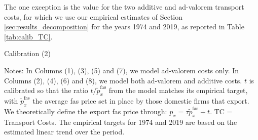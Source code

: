 \documentclass[a4paper,11pt]{article}
\begin{document}
The one exception is the value for the two additive and ad-valorem transport costs, for which we use our empirical estimates of Section \ref{sec:results_decomposition} for the years 1974 and 2019, as reported in Table \ref{tab:calib_TC}.

\begin{table}[htb]
  \centering
  \caption{Calibration (2)}\label{tab:calib_TC}
\begin{center}
	
\end{center}
{\parbox[l]{14cm}{ \vspace{4pt}\footnotesize{Notes: In Columns (1), (3), (5) and (7), we model ad-valorem costs only. In Columns (2), (4), (6) and (8), we model both ad-valorem and additive costs. $t$ is calibrated so that the ratio $t/\widetilde{p}^{\text{fas}}_x$ from the model matches its empirical target, with $\widetilde{p}^{\text{fas}}_x$ the average fas price set in place by those domestic firms that export. We theoretically define the export fas price through: $p_x = \tau \widetilde{p}_x^{\text{fas}} +t$. TC = Transport Costs. The empirical targets for 1974 and 2019 are based on the estimated linear trend over the period.}}}
\end{table}
\end{document}
